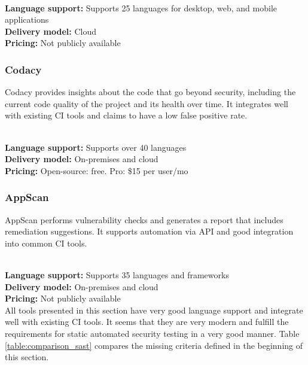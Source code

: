 \documentclass[conference]{IEEEtran}
\begin{document}
\noindent\\
\textbf{Language support:} Supports 25 languages for desktop, web, and mobile applications
\noindent\\
\textbf{Delivery model:} Cloud
\noindent\\
\textbf{Pricing:} Not publicly available
\\

\noindent
\subsubsection{Codacy \cite{sast4}}

Codacy provides insights about the code that go beyond security, including the current code quality of the project and its health over time. It integrates well with existing CI tools and claims to have a low false positive rate. 

\noindent\\
\textbf{Language support:} Supports over 40 languages
\noindent\\
\textbf{Delivery model:} On-premises and cloud
\noindent\\
\textbf{Pricing:} Open-source: free. Pro: \$15 per user/mo
\\

\noindent
\subsubsection{AppScan \cite{sast5}}

AppScan performs vulnerability checks and generates a report that includes remediation suggestions. It supports automation via API and good integration into common CI tools.

\noindent\\
\textbf{Language support:} Supports 35 languages and frameworks
\noindent\\
\textbf{Delivery model:} On-premises and cloud
\noindent\\
\textbf{Pricing:} Not publicly available
\\

All tools presented in this section have very good language support and integrate well with existing CI tools. It seems that they are very modern and fulfill the requirements for static automated security testing in a very good manner. Table \ref{table:comparison_sast} compares the missing criteria defined in the beginning of this section.
\end{document}
